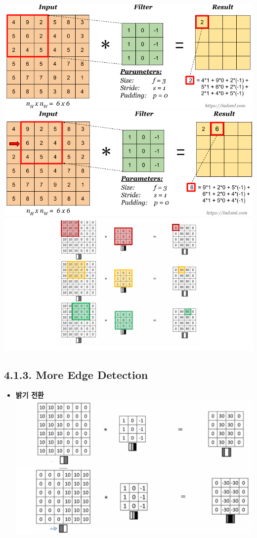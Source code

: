 \documentclass[11pt]{article}
\makeatletter
\def\maxwidth{\ifdim\Gin@nat@width>\linewidth\linewidth
    \else\Gin@nat@width\fi}
\let\Oldincludegraphics\includegraphics
\renewcommand{\includegraphics}[1]{\Oldincludegraphics[width=.8\maxwidth]{#1}}
\providecommand{\tightlist}{%
      \setlength{\itemsep}{0pt}\setlength{\parskip}{0pt}}
\makeatother
\begin{document}
 \includegraphics{./Images/c4week1/2-1.png} \\
\includegraphics{./Images/c4week1/2-1-2.png}
\includegraphics{./Images/c4week1/2-5.png} 

    \subsection{4.1.3. More Edge Detection}\label{more-edge-detection}

\begin{itemize}
\tightlist
\item
  \textbf{밝기 전환}\\
  \includegraphics{./Images/c4week1/3.png} 
\end{itemize}
\end{document}
